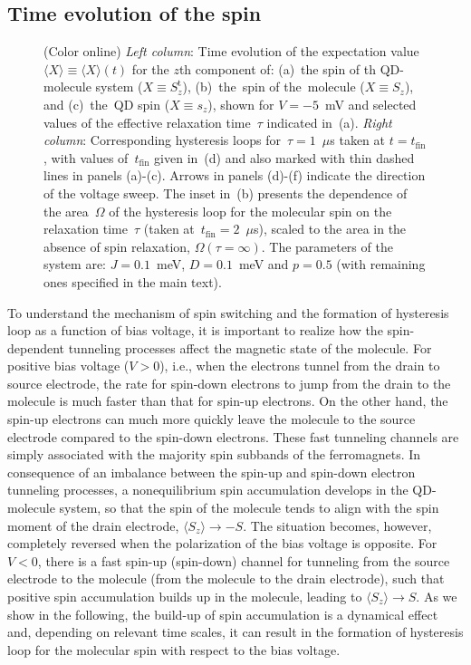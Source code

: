 \documentclass[doublecol]{epl2} %
\newcommand{\Szt}{S_z^\text{t}}
\newcommand{\tfin}{t_\text{fin}}
\begin{document}
\subsection{Time evolution of the spin}

%
\begin{figure}[t!]
  	\caption{
  	(Color online)
  	\emph{Left column}:
  	Time evolution of the expectation value~\mbox{$\langle X\rangle\equiv\langle X\rangle(t)$} for the $z$th component of: (a)~the spin of th QD-molecule system (\mbox{$X\equiv\Szt$}), (b)~the~spin of the~molecule (\mbox{$X\equiv S_z$}), and (c)~the~QD spin (\mbox{$X\equiv s_z$}), shown for \mbox{$V=-5$}~mV and selected values of the effective relaxation time~$\tau$ indicated in~(a).
  	\emph{Right column}: Corresponding hysteresis loops for~\mbox{$\tau=1$}~$\mu$s taken at \mbox{$t=\tfin$}, with values of~$\tfin$ given in~(d) and also marked with thin dashed lines in panels (a)-(c).
  	Arrows in panels (d)-(f) indicate the direction of the voltage sweep.
	The inset in~(b) presents the dependence of the area~$\Omega$ of the hysteresis loop for the molecular spin on the relaxation time~$\tau$ (taken at~$\tfin=2$~$\mu$s), scaled to the area in the absence of spin relaxation, \mbox{$\Omega(\tau=\infty)$}.
    The parameters of the system are: $J=0.1$~meV, $D=0.1$~meV and $p=0.5$ (with remaining ones specified in the main text).
    \label{fig2}
  	}
\end{figure}

To understand the mechanism of spin switching and the formation
of hysteresis loop as a function of bias voltage,
it is important to realize how the spin-dependent tunneling processes
affect the magnetic state of the molecule.
For positive bias voltage (\mbox{$V>0$}), i.e., when the electrons tunnel from the 
drain to source electrode, the rate for spin-down electrons to jump
from the drain to the molecule is much faster than that for spin-up electrons.
On the other hand, the spin-up electrons can much more quickly leave
the molecule to the source electrode compared to the spin-down electrons.
These fast tunneling channels are simply associated with the majority
spin subbands of the ferromagnets.
In consequence of an imbalance between the spin-up and spin-down
electron tunneling processes, a nonequilibrium spin accumulation develops in the QD-molecule system,
so that the  spin of the molecule tends to align with the spin moment of the 
drain electrode, \mbox{$\langle S_z \rangle \to -S$}.
The situation becomes, however, completely reversed when the 
polarization of the bias voltage is opposite.
For \mbox{$V<0$}, there is a fast spin-up (spin-down)
channel for tunneling from the source electrode to the molecule
(from the molecule to the drain electrode), such that 
positive spin accumulation builds up in the molecule, leading to
\mbox{$ \langle S_z \rangle \to S$}.
As we show in the following, the build-up of spin accumulation
is a dynamical effect and, depending on relevant time scales,
it can result in the formation of hysteresis loop
for the molecular spin with respect to the bias voltage.
\end{document}
